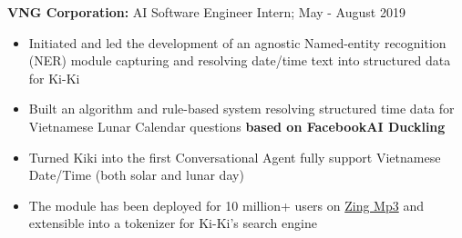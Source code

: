 \documentclass[a4paper,11pt]{article}
\begin{document}
\begin{flushleft}

	\textbf{VNG Corporation: } AI Software Engineer Intern; May - August 2019 \\
	\vspace{-\topsep}
	\begin{itemize}
		\setlength{\parskip}{2pt}
		\setlength{\itemsep}{0pt plus 1pt}
		\item Initiated and led the development of an agnostic Named-entity recognition (NER) module capturing and resolving date/time text into structured data for Ki-Ki
		\item Built an algorithm and rule-based system resolving structured time data for Vietnamese Lunar Calendar questions \textbf{based on FacebookAI Duckling}  
		\item Turned Kiki into the first Conversational Agent fully support Vietnamese Date/Time (both solar and lunar day) 
		\item  The module has been deployed for 10 million+ users on \href{https://mp3.zing.vn/}{Zing Mp3} and extensible into a tokenizer for Ki-Ki's search engine
	\end{itemize}
\vspace{-\topsep}
\centering{\noindent\makebox{\rule{8cm}{1.5pt}}}
\end{flushleft} 
\end{document}
